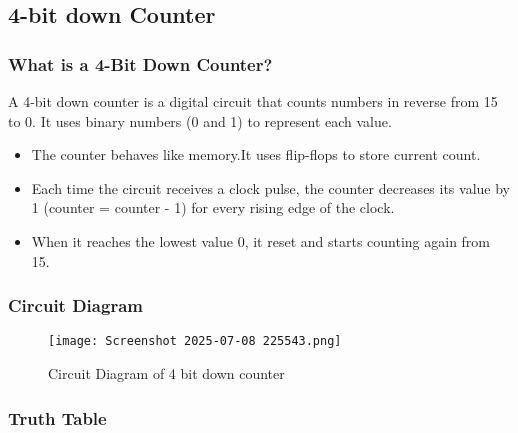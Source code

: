 \documentclass[12pt]{article}
\begin{document}
\subsection{4-bit down Counter}
\subsubsection{What is a 4-Bit Down Counter?}
A 4-bit down counter is a digital circuit that counts numbers in reverse from 15 to 0. It uses binary numbers (0 and 1) to represent each value.

\begin{itemize}
    \item The counter behaves like memory.It uses flip-flops to store current count.

    \item Each time the circuit receives a clock pulse, the counter decreases its value by 1 (counter = counter - 1) for every rising edge of the clock.
    
    \item When it reaches the lowest value 0, it reset and starts counting again from 15.
\end{itemize}


\subsubsection{Circuit Diagram}
\begin{figure}[H]
    \centering
    \texttt{[image: Screenshot 2025-07-08 225543.png]}
    \caption{Circuit Diagram of 4 bit down counter}
    \label{fig:enter-label}
\end{figure}
\subsubsection{Truth Table}
\end{document}
